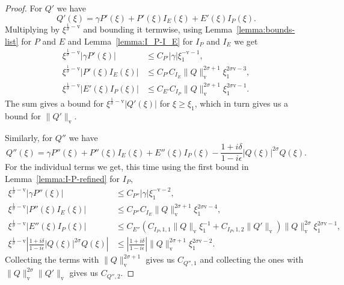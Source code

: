 \documentclass[11pt]{article}
\newcommand{\normv}{\mathrm{v}}
\begin{document}
\begin{proof}
  For \(Q'\) we have
  \begin{equation*}
    Q'(\xi) = \gamma P'(\xi) + P'(\xi)I_{E}(\xi) + E'(\xi)I_{P}(\xi).
  \end{equation*}
  Multiplying by \(\xi^{\frac{1}{\sigma} - \normv}\) and bounding it
  termwise, using Lemma~\ref{lemma:bounds-list} for \(P\) and \(E\)
  and Lemma~\ref{lemma:I_P-I_E} for \(I_{P}\) and \(I_{E}\) we get
  \begin{align*}
    \xi^{\frac{1}{\sigma} - \normv}|\gamma P'(\xi)|
    &\leq C_{P'}|\gamma|\xi_{1}^{-\normv - 1},\\
    \xi^{\frac{1}{\sigma} - \normv}|P'(\xi)I_{E}(\xi)|
    &\leq C_{P'}C_{I_{E}}
      \|Q\|_{\normv}^{2\sigma + 1}\xi_{1}^{2\sigma\normv - 3},\\
    \xi^{\frac{1}{\sigma} - \normv}|E'(\xi)I_{P}(\xi)|
    &\leq C_{E'}C_{I_{P}}
      \|Q\|_{\normv}^{2\sigma + 1}\xi_{1}^{2\sigma\normv - 1}.
  \end{align*}
  The sum gives a bound for
  \(\xi^{\frac{1}{\sigma} - \normv}|Q'(\xi)|\) for \(\xi \geq \xi_1\),
  which in turn gives us a bound for \(\|Q'\|_\normv\).

  Similarly, for \(Q''\) we have
  \begin{equation*}
    Q''(\xi) = \gamma P''(\xi)
    + P''(\xi)I_{E}(\xi)
    + E''(\xi)I_{P}(\xi)
    - \frac{1 + i\delta}{1 - i\epsilon}|Q(\xi)|^{2\sigma}Q(\xi).
  \end{equation*}
  For the individual terms we get, this time using the first bound in
  Lemma~\ref{lemma:I-P-refined} for \(I_{P}\),
  \begin{align*}
    \xi^{\frac{1}{\sigma} - \normv}|\gamma P''(\xi)|
    &\leq C_{P''}|\gamma|\xi_{1}^{-\normv - 2},\\
    \xi^{\frac{1}{\sigma} -\normv}|P''(\xi)I_{E}(\xi)|
    &\leq C_{P''}C_{I_{E}}\|Q\|_{\normv}^{2\sigma + 1}\xi_{1}^{2\sigma\normv - 4},\\
    \xi^{\frac{1}{\sigma} - \normv}|E''(\xi)I_{P}(\xi)|
    &\leq C_{E''}
      (C_{I_{P},1,1}\|Q\|_{\normv}\xi_{1}^{-1} + C_{I_{P},1,2}\|Q'\|_{\normv})\|Q\|_{\normv}^{2\sigma}\xi_{1}^{2\sigma\normv - 1},\\
    \xi^{\frac{1}{\sigma} - \normv}\left|\frac{1 + i\delta}{1 - i\epsilon}|Q(\xi)|^{2\sigma}Q(\xi)\right|
    &\leq \left|\frac{1 + i\delta}{1 - i\epsilon}\right|\|Q\|_{\normv}^{2\sigma + 1}\xi_{1}^{2\sigma\normv - 2}.
  \end{align*}
  Collecting the terms with \(\|Q\|_\normv^{2\sigma + 1}\) gives us
  \(C_{Q'',1}\) and collecting the ones with
  \(\|Q\|_\normv^{2\sigma}\|Q'\|_\normv\) gives us \(C_{Q'',2}\).


\end{proof}
\end{document}
